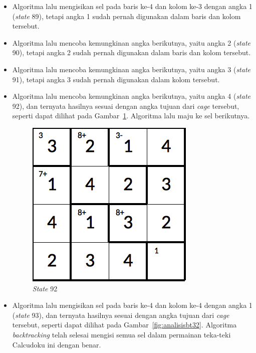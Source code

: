 \documentclass[a4paper,twoside]{article}
\begin{document}
\begin{enumerate}
\begin{itemize}
\item Algoritma lalu mengisikan sel pada baris ke-4 dan kolom ke-3 dengan angka 1 (\textit{state} 89), tetapi angka 1 sudah pernah digunakan dalam baris dan kolom tersebut.
\item Algoritma lalu mencoba kemungkinan angka berikutnya, yaitu angka 2 (\textit{state} 90), tetapi angka 2 sudah pernah digunakan dalam baris dan kolom tersebut.
\item Algoritma lalu mencoba kemungkinan angka berikutnya, yaitu angka 3 (\textit{state} 91), tetapi angka 3 sudah pernah digunakan dalam kolom tersebut.
\item Algoritma lalu mencoba kemungkinan angka berikutnya, yaitu angka 4 (\textit{state} 92), dan ternyata hasilnya sesuai dengan angka tujuan dari \textit{cage} tersebut, seperti dapat dilihat pada Gambar~\ref{fig:analisisbt31}. Algoritma lalu maju ke sel berikutnya.

\begin{figure}
\centering
\captionsetup{justification=centering}
\includegraphics[scale=0.333]{Gambar/backtracking/State92}
\caption[\textit{State} 92]{\textit{State} 92}
\label{fig:analisisbt31}
\end{figure}

\item Algoritma lalu mengisikan sel pada baris ke-4 dan kolom ke-4 dengan angka 1 (\textit{state} 93), dan ternyata hasilnya sesuai dengan angka tujuan dari \textit{cage} tersebut, seperti dapat dilihat pada Gambar~\ref{fig:analisisbt32}. Algoritma \textit{backtracking} telah selesai mengisi semua sel dalam permainan teka-teki Calcudoku ini dengan benar.


\end{itemize}
\end{enumerate}
\end{document}
